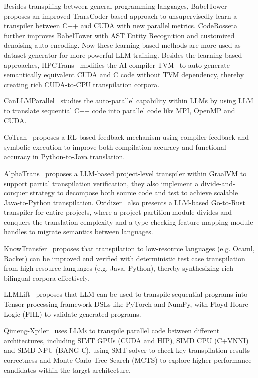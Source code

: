 \documentclass[pdflatex,sn-mathphys-ay,twocolumn, a4paper]{sn-jnl}%
\theoremstyle{thmstyleone}%
\theoremstyle{thmstyletwo}%
\theoremstyle{thmstylethree}%
\begin{document}
Besides transpiling between general programming languages, BabelTower~\citep{153_babeltower2022_icml} proposes an improved TransCoder-based approach to unsupervisedly learn a transpiler between C++ and CUDA with new parallel metrics.
CodeRosseta~\citep{174_coderosseta2024_neurips} further improves BabelTower with AST Entity Recognition and customized denoising auto-encoding. Now these learning-based methods are more used as dataset generator for more powerful LLM training. Besides the learning-based approaches, HPCTrans~\citep{2_HPCTransCompile2025_arxiv} modifies the AI compiler TVM~\citep{tvm_2018_osdi} to auto-generate semantically equivalent CUDA and C code without TVM dependency, thereby creating rich CUDA-to-CPU transpilation corpora.

CanLLMParallel~\citep{108_nichols2024can} studies the auto-parallel capability within LLMs by using LLM to translate sequential C++ code into parallel code like MPI, OpenMP and CUDA.

CoTran~\citep{38_jana2024cotran} proposes a RL-based feedback mechanism using compiler feedback and symbolic execution to improve both compilation accuracy and functional accuracy in Python-to-Java translation.

AlphaTrans~\citep{91_alphatrans2025_fse} proposes a LLM-based project-level transpiler within GraalVM to support partial transpilation verification, they also implement a divide-and-conquer strategy to decompose both source code and test to achieve scalable Java-to-Python transpilation.
Oxidizer~\citep{60_zhang2025_pldi} also presents a LLM-based Go-to-Rust transpiler for entire projects, where a project partition module divides-and-conquers the translation complexity and a type-checking feature mapping module handles to migrate semantics between languages. 

KnowTransfer~\citep{106_knowledgetransfer2024_oopsla} proposes that transpilation to low-resource languages (e.g. Ocaml, Racket) can be improved and verified with deterministic test case transpilation from high-resource languages (e.g. Java, Python), thereby synthesizing rich bilingual corpora effectively.

LLMLift~\citep{81_bhatia2024_neurips} proposes that LLM can be used to transpile sequential programs into Tensor-processing framework DSLs like PyTorch and NumPy, with Floyd-Hoare Logic (FHL) to validate generated programs.

Qimeng-Xpiler~\citep{10_qimengxpiler2025_osdi} uses LLMs to transpile parallel code between different architectures, including SIMT GPUs (CUDA and HIP), SIMD CPU (C+VNNI) and SIMD NPU (BANG C), using SMT-solver to check key transpilation results correctness and Monte-Carlo Tree Search (MCTS) to explore higher performance candidates within the target architecture. 
\end{document}
